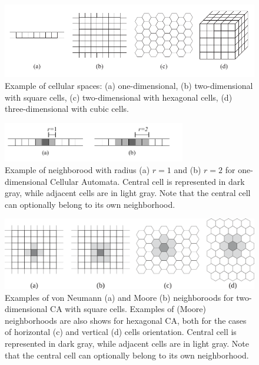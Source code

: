 \begin{figure}
  \begin{center}
    \includegraphics[width=12cm]{./images/CellularAutomata/cellularspaces.pdf}
    \caption{Example of cellular spaces: (a) one-dimensional, (b)
      two-dimensional with square cells, (c) two-dimensional with
      hexagonal cells, (d) three-dimensional with cubic cells.}
    \label{fig:cellularspaces}
  \end{center}
\end{figure}

\begin{figure}
  \begin{center}
    \includegraphics[width=8cm]{./images/CellularAutomata/onedimensional.pdf}
    \caption{Example of neighborood with radius (a) $r = 1$ and (b) $r
      = 2$ for one-dimensional Cellular Automata. Central cell is
      represented in dark gray, while adjacent cells are in light
      gray. Note that the central cell can optionally belong to its own
      neighborhood.}
    \label{fig:1Dneighborhood}
  \end{center}
\end{figure}

\begin{figure}
  \begin{center}
    \includegraphics[width=12cm]{./images/CellularAutomata/2Dneighborhoods.png}
    \caption{Examples of von Neumann (a) and Moore (b) neighboroods
      for two-dimensional CA with square cells. Examples of (Moore)
      neighborhoods are also shows for hexagonal CA, both for the
      cases of horizontal (c) and vertical (d) cells
      orientation. Central cell is represented in dark gray, while
      adjacent cells are in light gray. Note that the central cell can
      optionally belong to its own neighborhood.}
    \label{fig:2Dneighborhood}
  \end{center}
\end{figure}


